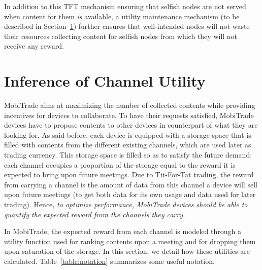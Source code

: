 In addition to this TFT mechanism ensuring that selfish nodes are not served when content for them \emph{is} available, a utility maintenance mechanism (to be described in Section~\ref{managing-channels}) further ensures that well-intended nodes will not waste their resources collecting content for selfish nodes from which they will not receive any reward.


\section{Inference of Channel Utility}
\label{managing-channels}

MobiTrade aims at maximizing the number of collected contents while providing incentives for devices to collaborate. To have their requests satisfied, MobiTrade devices have to propose contents to other devices in counterpart of what they are looking for. As said before, each device is equipped with a storage space that is filled with contents from the different existing channels, which are used later as trading currency. This storage space is filled so as to satisfy the future demand: each channel occupies a proportion of the storage equal to the reward it is expected to bring upon future meetings. Due to Tit-For-Tat trading, the reward from carrying a channel is the amount of data from this channel a device will sell upon future meetings (to get both data for its own usage and data used for later trading). Hence, \emph{to optimize performance, MobiTrade devices should be able to quantify the expected reward from the channels they carry.}

In MobiTrade, the expected reward from each channel is modeled through a utility function used for ranking contents upon a meeting and for dropping them upon saturation of the storage. In this section, we detail how these utilities are calculated. Table~\ref{table:notation} summarizes some useful notation.

